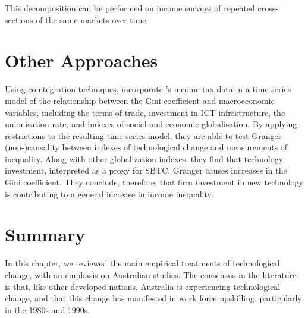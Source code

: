 This decomposition can be performed on income surveys of repeated cross-sections of the same markets over time.

\section{Other Approaches}

Using cointegration techniques, \citet{Gaston2009} incorporate \citet{Leigh2005}'s income tax data in a time series model of the relationship between the Gini coefficient and macroeconomic variables, including the terms of trade, investment in ICT infrastructure, the unionisation rate, and indexes of social and economic globalisation. By applying restrictions to the resulting time series model, they are able to test Granger (non-)causality between indexes of technological change and measurements of inequality. Along with other globalization indexes, they find that technology investment, interpreted as a proxy for SBTC, Granger causes increases in the Gini coefficient. They conclude, therefore, that firm investment in new technology is contributing to a general increase in income inequality.

\section{Summary}

In this chapter, we reviewed the main empirical treatments of technological change, with an emphasis on Australian studies. The consensus in the literature is that, like other developed nations, Australia is experiencing technological change, and that this change has manifested in work force upskilling, particularly in the 1980s and 1990s.



